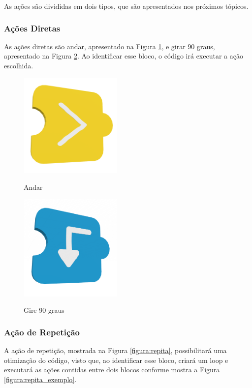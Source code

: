     As ações são divididas em dois tipos, que são apresentados nos próximos tópicos.
    
        \subsubsection{Ações Diretas}
        As ações diretas são andar, apresentado na Figura \ref{figura:andar}, e girar 90 graus, apresentado na Figura \ref{figura:girar}. Ao identificar esse bloco, o código irá executar a ação escolhida.
        
        \begin{figure}[H]
            \caption{Andar}
            \centering
            \includegraphics[width=5cm]{Imagens/cap3/Ande.png}
            \label{figura:andar}
        \end{figure}
        
        \begin{figure}[H]
            \caption{Gire 90 graus}
            \centering
            \includegraphics[width=5cm]{Imagens/cap3/Gire.png}
            \label{figura:girar}
        \end{figure}
        
        \subsubsection{Ação de Repetição}
        A ação de repetição, mostrada na Figura \ref{figura:repita}, possibilitará uma otimização do código, visto que, ao identificar esse bloco, criará um loop e executará as ações contidas entre dois blocos conforme mostra a Figura \ref{figura:repita_exemplo}.
        
